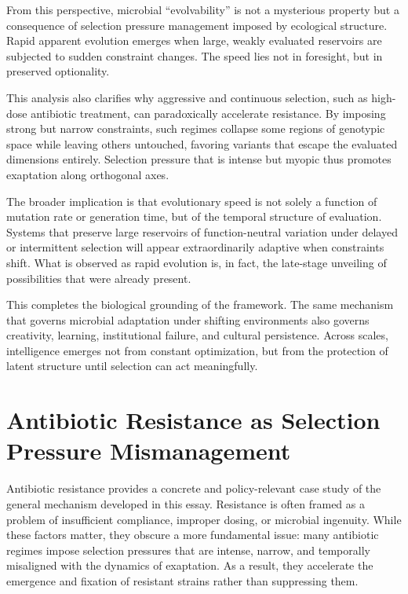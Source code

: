 \documentclass[11pt]{article}
\theoremstyle{definition}
\begin{document}
From this perspective, microbial ``evolvability'' is not a mysterious property but a consequence of selection pressure management imposed by ecological structure. Rapid apparent evolution emerges when large, weakly evaluated reservoirs are subjected to sudden constraint changes. The speed lies not in foresight, but in preserved optionality.

This analysis also clarifies why aggressive and continuous selection, such as high-dose antibiotic treatment, can paradoxically accelerate resistance. By imposing strong but narrow constraints, such regimes collapse some regions of genotypic space while leaving others untouched, favoring variants that escape the evaluated dimensions entirely. Selection pressure that is intense but myopic thus promotes exaptation along orthogonal axes.

The broader implication is that evolutionary speed is not solely a function of mutation rate or generation time, but of the temporal structure of evaluation. Systems that preserve large reservoirs of function-neutral variation under delayed or intermittent selection will appear extraordinarily adaptive when constraints shift. What is observed as rapid evolution is, in fact, the late-stage unveiling of possibilities that were already present.

This completes the biological grounding of the framework. The same mechanism that governs microbial adaptation under shifting environments also governs creativity, learning, institutional failure, and cultural persistence. Across scales, intelligence emerges not from constant optimization, but from the protection of latent structure until selection can act meaningfully.

\section{Antibiotic Resistance as Selection Pressure Mismanagement}

Antibiotic resistance provides a concrete and policy-relevant case study of the general mechanism developed in this essay. Resistance is often framed as a problem of insufficient compliance, improper dosing, or microbial ingenuity. While these factors matter, they obscure a more fundamental issue: many antibiotic regimes impose selection pressures that are intense, narrow, and temporally misaligned with the dynamics of exaptation. As a result, they accelerate the emergence and fixation of resistant strains rather than suppressing them.
\end{document}
